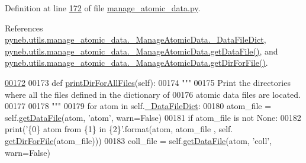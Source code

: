 Definition at line \hyperlink{manage__atomic__data_8py_source_l00172}{172} of file \hyperlink{manage__atomic__data_8py_source}{manage\-\_\-atomic\-\_\-data.\-py}.



References \hyperlink{manage__atomic__data_8py_source_l00078}{pyneb.\-utils.\-manage\-\_\-atomic\-\_\-data.\-\_\-\-Manage\-Atomic\-Data.\-\_\-\-Data\-File\-Dict}, \hyperlink{manage__atomic__data_8py_source_l00297}{pyneb.\-utils.\-manage\-\_\-atomic\-\_\-data.\-\_\-\-Manage\-Atomic\-Data.\-get\-Data\-File()}, and \hyperlink{manage__atomic__data_8py_source_l00144}{pyneb.\-utils.\-manage\-\_\-atomic\-\_\-data.\-\_\-\-Manage\-Atomic\-Data.\-get\-Dir\-For\-File()}.


\begin{DoxyCode}
\hypertarget{classpyneb_1_1utils_1_1manage__atomic__data_1_1___manage_atomic_data_l00172}{}\hyperlink{classpyneb_1_1utils_1_1manage__atomic__data_1_1___manage_atomic_data_ad7f762085433e230871677fbc61a99e2}{00172} 
00173     \textcolor{keyword}{def }\hyperlink{classpyneb_1_1utils_1_1manage__atomic__data_1_1___manage_atomic_data_ad7f762085433e230871677fbc61a99e2}{printDirForAllFiles}(self):
00174         \textcolor{stringliteral}{"""}
00175 \textcolor{stringliteral}{        Print the directories where all the files defined in the dictionary of }
00176 \textcolor{stringliteral}{            atomic data files are located.}
00177 \textcolor{stringliteral}{}
00178 \textcolor{stringliteral}{        """}
00179         \textcolor{keywordflow}{for} atom \textcolor{keywordflow}{in} self.\hyperlink{classpyneb_1_1utils_1_1manage__atomic__data_1_1___manage_atomic_data_a25a8e0770b6d8a375cfc9092d600684d}{\_DataFileDict}:
00180             atom\_file = self.\hyperlink{classpyneb_1_1utils_1_1manage__atomic__data_1_1___manage_atomic_data_a289b3ad01e359e3550b2384362c36990}{getDataFile}(atom, \textcolor{stringliteral}{'atom'}, warn=\textcolor{keyword}{False})
00181             \textcolor{keywordflow}{if} atom\_file \textcolor{keywordflow}{is} \textcolor{keywordflow}{not} \textcolor{keywordtype}{None}:
00182                 print(\textcolor{stringliteral}{'\{0\} atom from \{1\} in \{2\}'}.format(atom, atom\_file , self.
      \hyperlink{classpyneb_1_1utils_1_1manage__atomic__data_1_1___manage_atomic_data_a9ac8137de7ee37d8fa2dee5f446ba045}{getDirForFile}(atom\_file)))
00183             coll\_file = self.\hyperlink{classpyneb_1_1utils_1_1manage__atomic__data_1_1___manage_atomic_data_a289b3ad01e359e3550b2384362c36990}{getDataFile}(atom, \textcolor{stringliteral}{'coll'}, warn=\textcolor{keyword}{False})

\end{DoxyCode}

